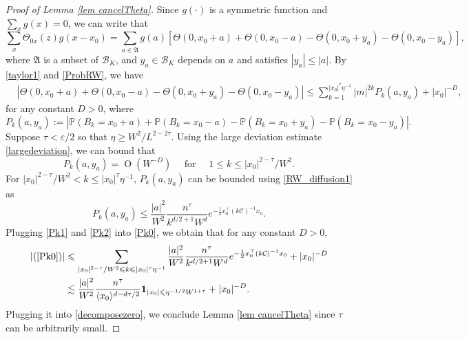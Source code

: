 \documentclass{article}
\newcommand{\1}{\mathds{1}}
\numberwithin{equation}{section}
\newcommand{\be}{\begin{equation}}
\newcommand{\ee}{\end{equation}}
\newcommand{\e}{{\varepsilon}}
\renewcommand{\cal}{\mathcal}
\renewcommand{\leq}{\leqslant}
\renewcommand{\geq}{\geqslant}
\renewcommand{\le}{\leq}
\renewcommand{\ge}{\geq}
\DeclareMathOperator{\OO}{O}
\theoremstyle{plain} %
\theoremstyle{remark}
\begin{document}
\begin{proof}[Proof of Lemma \ref{lem cancelTheta}]
Since $g(\cdot)$ is a symmetric function and $\sum_x g(x)=0$, we can write that
\be\label{decomposezero} \sum_{x}\Theta_{0 x}(z) g(x-x_0) =\sum_{a\in\mathfrak A} g(a) \left[  \Theta(0,x_0+a)+ \Theta(0,x_0-a) - \Theta(0,x_0+y_a) -\Theta(0,x_0-y_a)\right],\ee
where $\mathfrak A$ is a subset of $\cal B_K$, and $y_a\in \cal B_K$ depends on $a$ and satisfies $|y_a|\le |a|$. %
By \eqref{taylor1} and \eqref{ProbRW}, we have
 \begin{align}\label{Pk0}
&\left|  \Theta(0,x_0+a)+ \Theta(0,x_0-a) - \Theta(0,x_0+y_a) -\Theta(0,x_0-y_a)\right|\le \sum_{k=1}^{|x_0|^\tau \eta^{-1}}|m|^{2k}  P_k(a,y_a) + |x_0|^{-D} ,
 \end{align} 
for any constant $ D>0$, where 
 $$P_k(a,y_a):= \left| \mathbb P\left(B_k = x_0+a\right) + \mathbb P\left(B_k = x_0-a \right) - \mathbb P\left(B_k = x_0 + y_{a}\right)- \mathbb P\left(B_k = x_0 - y_{a}\right) \right| .$$
Suppose $\tau <\e/2$ so that $\eta\ge W^{2 }/L^{2-2\tau}$. Using the large deviation estimate \eqref{largedeviation}, we can bound that
\be\label{Pk1} 
P_k(a,y_a)=\OO(W^{-D}) \quad \text{ for }\quad 1\le k \le {|x_0|^{2-\tau}}/{W^{2}}.
\ee
For ${|x_0|^{2-\tau}}/{W^{2}} < k\le |x_0|^\tau \eta^{-1}$, $P_k(a,y_a)$ can be bounded using \eqref{RW_diffusion1} as 
\be\label{Pk2}  P_k(a,y_a)\le   \frac{| a |^2}{W^2} \frac{n^\tau}{k^{d/2+1}W^d}e^{-\frac1{2} x_0^\top (k\cal C)^{-1} x_0} .\ee
Plugging \eqref{Pk1} and \eqref{Pk2} into \eqref{Pk0}, we obtain that for any constant $D>0$,
\begin{align*}
|(\ref{Pk0})|&\le \sum_{{|x_0|^{2-\tau}}/{W^{2 }}  \le k\le |x_0|^\tau \eta^{-1}}  \frac{| a |^2}{W^2} \frac{n^\tau}{k^{d/2+1}W^d}e^{-\frac1{2} x_0^\top (k\cal C)^{-1} x_0} + |x_0|^{-D} \\
& \lesssim \frac{|a|^2}{W^2}\frac{n^{\tau} }{\langle x_0 \rangle^{d-d\tau/2}}\mathbf 1_{|x_0|\le  \eta^{-1/2}W^{1+\tau}} +  |x_0|^{-D}.
\end{align*}
Plugging it into \eqref{decomposezero}, we conclude Lemma \ref{lem cancelTheta} since $\tau$ can be arbitrarily small. 
\end{proof}
\end{document}
